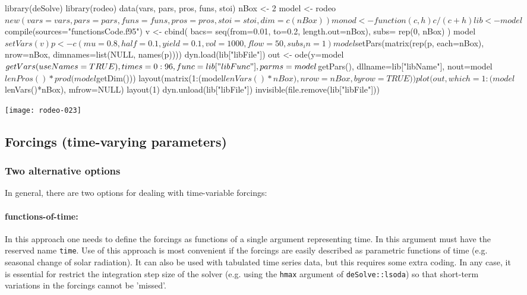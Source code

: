 \documentclass[onecolumn]{article}
\begin{document}
\begin{Schunk}
\begin{Sinput}
 library(deSolve)
 library(rodeo)
 data(vars, pars, pros, funs, stoi)
 nBox <- 2
 model <- rodeo$new(vars=vars, pars=pars, funs=funs,
   pros=pros, stoi=stoi, dim=c(nBox))
 monod <- function(c,h) { c / (c + h) }
 lib <- model$compile(sources="functionsCode.f95")
 v <- cbind(
   bacs= seq(from=0.01, to=0.2, length.out=nBox),
   subs= rep(0, nBox)
 )
 model$setVars(v)
 p <- c(mu=0.8, half=0.1, yield= 0.1,
   vol=1000, flow=50, subs_in=1)
 model$setPars(matrix(rep(p, each=nBox), nrow=nBox,
   dimnames=list(NULL, names(p))))
 dyn.load(lib["libFile"])
 out <- ode(y=model$getVars(useNames=TRUE), times=0:96,
   func=lib["libFunc"], parms=model$getPars(), dllname=lib["libName"],
   nout=model$lenPros()*prod(model$getDim()))
 layout(matrix(1:(model$lenVars()*nBox), nrow=nBox, byrow=TRUE))
 plot(out, which=1:(model$lenVars()*nBox), mfrow=NULL)
 layout(1)
 dyn.unload(lib["libFile"])
 invisible(file.remove(lib["libFile"]))
\end{Sinput}
\end{Schunk}
\texttt{[image: rodeo-023]}


\subsection{Forcings (time-varying parameters)} \label{sec:advanced:forcings}

\subsubsection{Two alternative options}
In general, there are two options for dealing with time-variable forcings:

\paragraph{functions-of-time:} In this approach one needs to define the forcings as functions of a single argument representing time. In  this argument must have the reserved name \verb|time|. Use of this approach is most convenient if the forcings are easily described as parametric functions of time (e.g. seasonal change of solar radiation). It can also be used with tabulated time series data, but this requires some extra coding. In any case, it is essential for restrict the integration step size of the solver (e.g. using the \verb|hmax| argument of \verb|deSolve::lsoda|) so that short-term variations in the forcings cannot be 'missed'.
 
\end{document}
